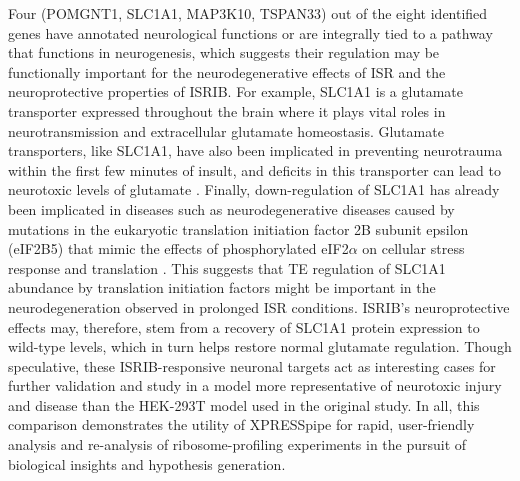 \documentclass[10pt, oneside]{article}
\begin{document}
\begin{multicols}{2}
Four (POMGNT1, SLC1A1, MAP3K10, TSPAN33) out of the eight identified genes have annotated neurological functions or are integrally tied to a pathway that functions in neurogenesis, which suggests their regulation may be functionally important for the neurodegenerative effects of ISR and the neuroprotective properties of ISRIB. For example, SLC1A1 is a glutamate transporter expressed throughout the brain where it plays vital roles in neurotransmission and extracellular glutamate homeostasis. Glutamate transporters, like SLC1A1, have also been implicated in preventing neurotrauma within the first few minutes of insult, and deficits in this transporter can lead to neurotoxic levels of glutamate \cite{slc1a1_neurotoxic}. Finally, down-regulation of SLC1A1 has already been implicated in diseases such as neurodegenerative diseases caused by mutations in the eukaryotic translation initiation factor 2B subunit epsilon (eIF2B5) that mimic the effects of phosphorylated eIF2$\alpha$ on cellular stress response and translation \cite{eif2b_neuroprotective, isrib_riboseq, isrib_structure}. This suggests that TE regulation of SLC1A1 abundance by translation initiation factors might be important in the neurodegeneration observed in prolonged ISR conditions. ISRIB's neuroprotective effects may, therefore, stem from a recovery of SLC1A1 protein expression to wild-type levels, which in turn helps restore normal glutamate regulation. Though speculative, these ISRIB-responsive neuronal targets act as interesting cases for further validation and study in a model more representative of neurotoxic injury and disease than the HEK-293T model used in the original study. In all, this comparison demonstrates the utility of XPRESSpipe for rapid, user-friendly analysis and re-analysis of ribosome-profiling experiments in the pursuit of biological insights and hypothesis generation. \par


\end{multicols}
\end{document}
